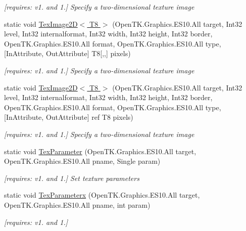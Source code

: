 \begin{DoxyCompactItemize}
\begin{DoxyCompactList}\small\item\em \mbox{[}requires\-: v1. and 1.\mbox{]} Specify a two-\/dimensional texture image \end{DoxyCompactList}\item 
static void \hyperlink{class_open_t_k_1_1_graphics_1_1_e_s10_1_1_g_l_a6d37753875645e4e09ba4f501bf42c34}{Tex\-Image2\-D$<$ T8 $>$} (Open\-T\-K.\-Graphics.\-E\-S10.\-All target, Int32 level, Int32 internalformat, Int32 width, Int32 height, Int32 border, Open\-T\-K.\-Graphics.\-E\-S10.\-All format, Open\-T\-K.\-Graphics.\-E\-S10.\-All type, \mbox{[}In\-Attribute, Out\-Attribute\mbox{]} T8\mbox{[},,\mbox{]} pixels)
\begin{DoxyCompactList}\small\item\em \mbox{[}requires\-: v1. and 1.\mbox{]} Specify a two-\/dimensional texture image \end{DoxyCompactList}\item 
static void \hyperlink{class_open_t_k_1_1_graphics_1_1_e_s10_1_1_g_l_a7f92a397350cb5b0d1e4609c611bcb67}{Tex\-Image2\-D$<$ T8 $>$} (Open\-T\-K.\-Graphics.\-E\-S10.\-All target, Int32 level, Int32 internalformat, Int32 width, Int32 height, Int32 border, Open\-T\-K.\-Graphics.\-E\-S10.\-All format, Open\-T\-K.\-Graphics.\-E\-S10.\-All type, \mbox{[}In\-Attribute, Out\-Attribute\mbox{]} ref T8 pixels)
\begin{DoxyCompactList}\small\item\em \mbox{[}requires\-: v1. and 1.\mbox{]} Specify a two-\/dimensional texture image \end{DoxyCompactList}\item 
static void \hyperlink{class_open_t_k_1_1_graphics_1_1_e_s10_1_1_g_l_af3a4f640ef80418ec5e439350494a5c3}{Tex\-Parameter} (Open\-T\-K.\-Graphics.\-E\-S10.\-All target, Open\-T\-K.\-Graphics.\-E\-S10.\-All pname, Single param)
\begin{DoxyCompactList}\small\item\em \mbox{[}requires\-: v1. and 1.\mbox{]} Set texture parameters \end{DoxyCompactList}\item 
static void \hyperlink{class_open_t_k_1_1_graphics_1_1_e_s10_1_1_g_l_abbbbc19f8e8e4f22420e1ce521eaa1ee}{Tex\-Parameterx} (Open\-T\-K.\-Graphics.\-E\-S10.\-All target, Open\-T\-K.\-Graphics.\-E\-S10.\-All pname, int param)
\begin{DoxyCompactList}\small\item\em \mbox{[}requires\-: v1. and 1.\mbox{]}\end{DoxyCompactList}\item 

\end{DoxyCompactItemize}
